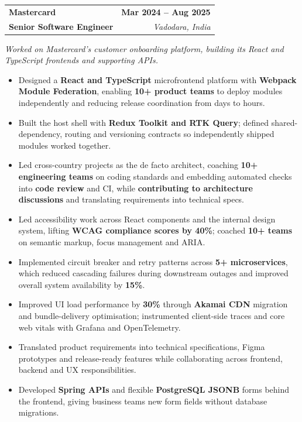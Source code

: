 \documentclass[letterpaper,10pt]{article}
\makeatletter
\newcommand{\resumeRole}[4]{%
  \noindent\begin{tabular*}{\textwidth}{@{}l@{\extracolsep{\fill}}r@{}}
    \textbf{#1} & \textbf{#2}\\[1pt]
    \textbf{#3} & \textit{#4}\\[3pt]
  \end{tabular*}\vspace{-2pt}
}
\newenvironment{resumeBullets}{%
  \begin{itemize}[leftmargin=0.19in,label=\textbullet,itemsep=0.2pt,topsep=0.8pt,parsep=0pt,partopsep=0pt]
}{%
  \end{itemize}\vspace{1pt}
}
\newcommand{\resumeContext}[1]{\noindent\textit{#1}\par\vspace{1pt}}
\makeatother
\begin{document}
\resumeRole{Mastercard}{Mar 2024 -- Aug 2025}{Senior Software Engineer}{Vadodara, India}
\resumeContext{Worked on Mastercard's customer onboarding platform, building its React and TypeScript frontends and supporting APIs.}
\begin{resumeBullets}
  \item Designed a \textbf{React and TypeScript} microfrontend platform with \textbf{Webpack Module Federation}, enabling \textbf{10+ product teams} to deploy modules independently and reducing release coordination from days to hours.
  \item Built the host shell with \textbf{Redux Toolkit and RTK Query}; defined shared-dependency, routing and versioning contracts so independently shipped modules worked together.
  \item{Led cross-country projects as the de facto architect, coaching \textbf{10+ engineering teams} on coding standards and embedding automated checks into \textbf{code review} and CI, while \textbf{contributing to architecture discussions} and translating requirements into technical specs.}
    
  \item Led accessibility work across React components and the internal design system, lifting \textbf{WCAG compliance scores by 40\%}; coached \textbf{10+ teams} on semantic markup, focus management and ARIA.
  \item Implemented circuit breaker and retry patterns across \textbf{5+ microservices}, which reduced cascading failures during downstream outages and improved overall system availability by \textbf{15\%}.
  \item Improved UI load performance by \textbf{30\%} through \textbf{Akamai CDN} migration and bundle-delivery optimisation; instrumented client-side traces and core web vitals with Grafana and OpenTelemetry.
  \item Translated product requirements into technical specifications, Figma prototypes and release-ready features while collaborating across frontend, backend and UX responsibilities.
  \item Developed \textbf{Spring APIs} and flexible \textbf{PostgreSQL JSONB} forms behind the frontend, giving business teams new form fields without database migrations.
\end{resumeBullets}
\end{document}

